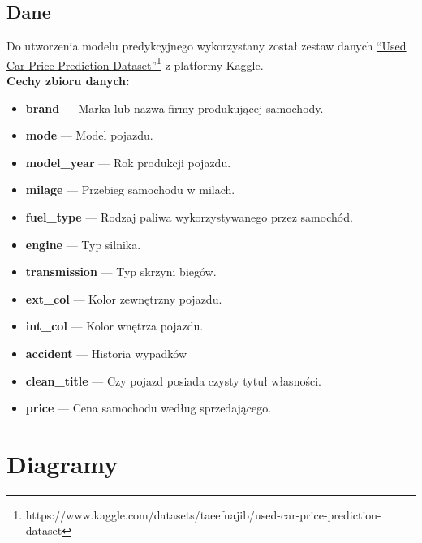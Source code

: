 \documentclass[12pt, a4paper]{report}
\begin{document}
\section{Dane}
Do utworzenia modelu predykcyjnego wykorzystany został zestaw danych
 \href{https://www.kaggle.com/datasets/taeefnajib/used-car-price-prediction-dataset}{``Used Car Price Prediction Dataset''}\footnote{https://www.kaggle.com/datasets/taeefnajib/used-car-price-prediction-dataset}
  z platformy Kaggle. \\[1cm]
\textbf{Cechy zbioru danych:}
\begin{itemize}
    \item \textbf{brand} --- Marka lub nazwa firmy produkującej samochody.
    \item \textbf{mode} --- Model pojazdu.
    \item \textbf{model\_year} --- Rok produkcji pojazdu.
    \item \textbf{milage} --- Przebieg samochodu w milach.
    \item \textbf{fuel\_type} --- Rodzaj paliwa wykorzystywanego przez samochód.
    \item \textbf{engine} --- Typ silnika.
    \item \textbf{transmission} --- Typ skrzyni biegów.
    \item \textbf{ext\_col} --- Kolor zewnętrzny pojazdu.
    \item \textbf{int\_col} --- Kolor wnętrza pojazdu.
    \item \textbf{accident} --- Historia wypadków
    \item \textbf{clean\_title} --- Czy pojazd posiada czysty tytuł własności.
    \item \textbf{price} --- Cena samochodu według sprzedającego.
\end{itemize}

\chapter{Diagramy}
\end{document}

